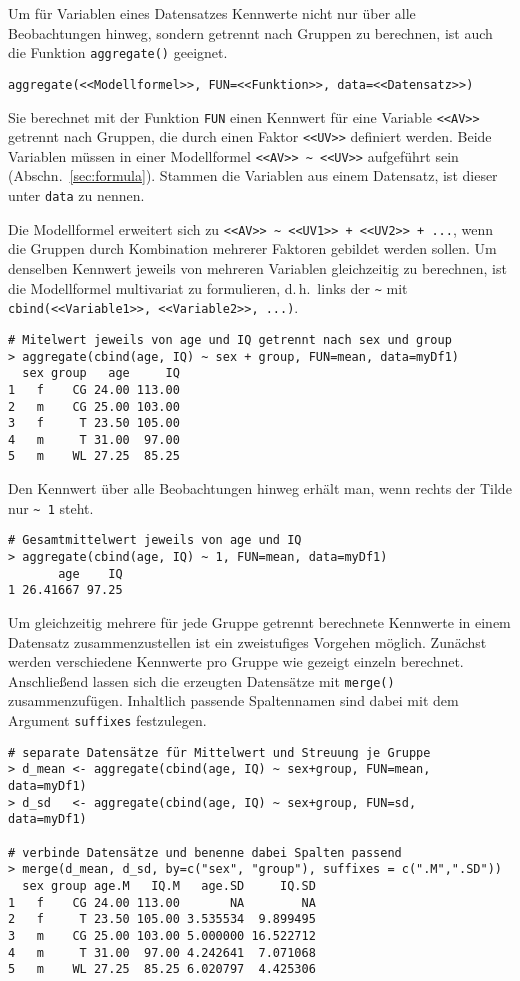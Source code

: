 Um für Variablen eines Datensatzes Kennwerte nicht nur über alle Beobachtungen hinweg, sondern getrennt nach Gruppen zu berechnen, ist auch die Funktion \lstinline!aggregate()! geeignet.
\begin{lstlisting}
aggregate(<<Modellformel>>, FUN=<<Funktion>>, data=<<Datensatz>>)
\end{lstlisting}

Sie berechnet mit der Funktion \lstinline!FUN! einen Kennwert für eine Variable \lstinline!<<AV>>! getrennt nach Gruppen, die durch einen Faktor \lstinline!<<UV>>! definiert werden. Beide Variablen müssen in einer Modellformel \lstinline!<<AV>> ~ <<UV>>! aufgeführt sein (Abschn.\ \ref{sec:formula}). Stammen die Variablen aus einem Datensatz, ist dieser unter \lstinline!data! zu nennen.

Die Modellformel erweitert sich zu \lstinline!<<AV>> ~ <<UV1>> + <<UV2>> + ...!, wenn die Gruppen durch Kombination mehrerer Faktoren gebildet werden sollen. Um denselben Kennwert jeweils von mehreren Variablen gleichzeitig zu berechnen, ist die Modellformel multivariat zu formulieren, d.\,h.\ links der \lstinline!~! mit \lstinline!cbind(<<Variable1>>, <<Variable2>>, ...)!.
\begin{lstlisting}
# Mitelwert jeweils von age und IQ getrennt nach sex und group
> aggregate(cbind(age, IQ) ~ sex + group, FUN=mean, data=myDf1)
  sex group   age     IQ
1   f    CG 24.00 113.00
2   m    CG 25.00 103.00
3   f     T 23.50 105.00
4   m     T 31.00  97.00
5   m    WL 27.25  85.25
\end{lstlisting}

Den Kennwert über alle Beobachtungen hinweg erhält man, wenn rechts der Tilde nur \lstinline!~ 1! steht.
\begin{lstlisting}
# Gesamtmittelwert jeweils von age und IQ
> aggregate(cbind(age, IQ) ~ 1, FUN=mean, data=myDf1)
       age    IQ
1 26.41667 97.25
\end{lstlisting}

Um gleichzeitig mehrere für jede Gruppe getrennt berechnete Kennwerte in einem Datensatz zusammenzustellen ist ein zweistufiges Vorgehen möglich. Zunächst werden verschiedene Kennwerte pro Gruppe wie gezeigt einzeln berechnet. Anschließend lassen sich die erzeugten Datensätze mit \lstinline!merge()! zusammenzufügen. Inhaltlich passende Spaltennamen sind dabei mit dem Argument \lstinline!suffixes! festzulegen.
\begin{lstlisting}
# separate Datensätze für Mittelwert und Streuung je Gruppe
> d_mean <- aggregate(cbind(age, IQ) ~ sex+group, FUN=mean, data=myDf1)
> d_sd   <- aggregate(cbind(age, IQ) ~ sex+group, FUN=sd,   data=myDf1)

# verbinde Datensätze und benenne dabei Spalten passend
> merge(d_mean, d_sd, by=c("sex", "group"), suffixes = c(".M",".SD"))
  sex group age.M   IQ.M   age.SD     IQ.SD
1   f    CG 24.00 113.00       NA        NA
2   f     T 23.50 105.00 3.535534  9.899495
3   m    CG 25.00 103.00 5.000000 16.522712
4   m     T 31.00  97.00 4.242641  7.071068
5   m    WL 27.25  85.25 6.020797  4.425306
\end{lstlisting}

